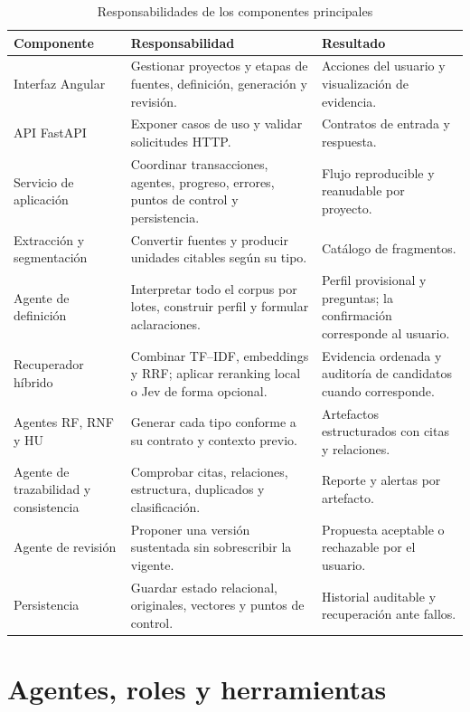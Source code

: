\begin{table}[H]
  \centering
  \caption{Responsabilidades de los componentes principales}
  \label{tab:componentes}
  \small
  \begin{tabularx}{\textwidth}{p{3.7cm}p{4.1cm}Y}
    \toprule
    Componente & Responsabilidad & Resultado \\
    \midrule
    Interfaz Angular & Gestionar proyectos y etapas de fuentes, definición, generación y revisión. & Acciones del usuario y visualización de evidencia. \\
    API FastAPI & Exponer casos de uso y validar solicitudes HTTP. & Contratos de entrada y respuesta. \\
    Servicio de aplicación & Coordinar transacciones, agentes, progreso, errores, puntos de control y persistencia. & Flujo reproducible y reanudable por proyecto. \\
    Extracción y segmentación & Convertir fuentes y producir unidades citables según su tipo. & Catálogo de fragmentos. \\
    Agente de definición & Interpretar todo el corpus por lotes, construir perfil y formular aclaraciones. & Perfil provisional y preguntas; la confirmación corresponde al usuario. \\
    Recuperador híbrido & Combinar TF--IDF, embeddings y RRF; aplicar reranking local o Jev de forma opcional. & Evidencia ordenada y auditoría de candidatos cuando corresponde. \\
    Agentes RF, RNF y HU & Generar cada tipo conforme a su contrato y contexto previo. & Artefactos estructurados con citas y relaciones. \\
    Agente de trazabilidad y consistencia & Comprobar citas, relaciones, estructura, duplicados y clasificación. & Reporte y alertas por artefacto. \\
    Agente de revisión & Proponer una versión sustentada sin sobrescribir la vigente. & Propuesta aceptable o rechazable por el usuario. \\
    Persistencia & Guardar estado relacional, originales, vectores y puntos de control. & Historial auditable y recuperación ante fallos. \\
    \bottomrule
  \end{tabularx}
\end{table}

\section{Agentes, roles y herramientas}

